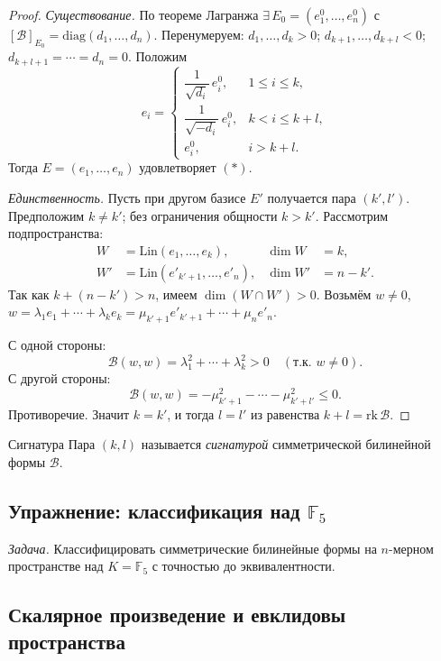 \begin{proof}
	\textit{Существование.}
	По теореме Лагранжа $\exists\, E_0 = (e^0_1,\ldots,e^0_n)$ с $[\mathcal{B}]_{E_0} = \mathrm{diag}(d_1,\ldots,d_n)$.
	Перенумеруем: $d_1,\ldots,d_k > 0$;\; $d_{k+1},\ldots,d_{k+l} < 0$;\; $d_{k+l+1} = \cdots = d_n = 0$.
	Положим
	\[
	e_i = \begin{cases}
		\dfrac{1}{\sqrt{d_i}}\,e^0_i, & 1 \leq i \leq k, \\[5pt]
		\dfrac{1}{\sqrt{-d_i}}\,e^0_i, & k < i \leq k+l, \\[5pt]
		e^0_i, & i > k+l.
	\end{cases}
	\]
	Тогда $E = (e_1,\ldots,e_n)$ удовлетворяет $(*)$.
	
	\textit{Единственность.}
	Пусть при другом базисе $E'$ получается пара $(k', l')$.
	Предположим $k \neq k'$; без ограничения общности $k > k'$.
	Рассмотрим подпространства:
	\begin{align*}
		W  &= \mathrm{Lin}(e_1,\ldots,e_k), &\dim W  &= k, \\
		W' &= \mathrm{Lin}(e'_{k'+1},\ldots,e'_n), &\dim W' &= n-k'.
	\end{align*}
	Так как $k + (n-k') > n$, имеем $\dim(W \cap W') > 0$.
	Возьмём $w \neq 0$,\; $w = \lambda_1 e_1 + \cdots + \lambda_k e_k = \mu_{k'+1}e'_{k'+1} + \cdots + \mu_n e'_n$.
	
	С одной стороны:
	\[
	\mathcal{B}(w,w) = \lambda_1^2 + \cdots + \lambda_k^2 > 0 \quad (\text{т.к.\ } w \neq 0).
	\]
	С другой стороны:
	\[
	\mathcal{B}(w,w) = -\mu_{k'+1}^2 - \cdots - \mu_{k'+l'}^2 \leq 0.
	\]
	Противоречие. Значит $k = k'$, и тогда $l = l'$ из равенства $k + l = \mathrm{rk}\,\mathcal{B}$.
\end{proof}

\begin{Definition}{Сигнатура}{}
	Пара $(k,l)$ называется \textit{сигнатурой} симметрической билинейной формы $\mathcal{B}$.
\end{Definition}

\subsection{Упражнение: классификация над $\mathbb{F}_5$}

\textit{Задача.} Классифицировать симметрические билинейные формы на $n$-мерном пространстве над $K = \mathbb{F}_5$ с точностью до эквивалентности.

\subsection{Скалярное произведение и евклидовы пространства}

